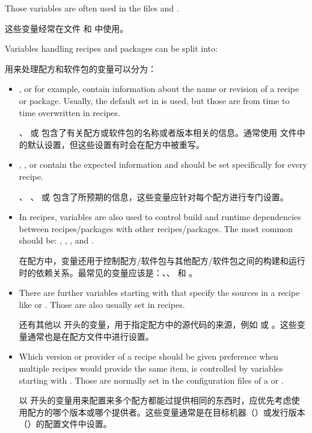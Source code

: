 Those variables are often used in the files  and .

这些变量经常在文件  和  中使用。

Variables handling recipes and packages can be split into:

用来处理配方和软件包的变量可以分为：

\begin{itemize}
\setlength\itemsep{1.0em}
    
\item {},  or  for example, contain information about the name or revision of a recipe or package. Usually, the default set in  is used, but those are from time to time overwritten in recipes.

\medskip
{}、  或  包含了有关配方或软件包的名称或者版本相关的信息。通常使用  文件中的默认设置，但这些设置有时会在配方中被重写。

\item {}, ,  or  contain the expected information and should be set specifically for every recipe.

\medskip
{}、 、  或  包含了所预期的信息，这些变量应针对每个配方进行专门设置。

\item In recipes, variables are also used to control build and runtime dependencies between recipes/packages with other recipes/packages. The most common should be: , , , and .

\medskip
在配方中，变量还用于控制配方/软件包与其他配方/软件包之间的构建和运行时的依赖关系。最常见的变量应该是：、、 和 。

\item There are further variables starting with  that specify the sources in a recipe like  or . Those are also usually set in recipes.

\medskip
还有其他以  开头的变量，用于指定配方中的源代码的来源，例如  或 。这些变量通常也是在配方文件中进行设置。

\item Which version or provider of a recipe should be given preference when multiple recipes would provide the same item, is controlled by variables starting with . Those are normally set in the configuration files of a  or .

\medskip
以  开头的变量用来配置来多个配方都能过提供相同的东西时，应优先考虑使用配方的哪个版本或哪个提供者。这些变量通常是在目标机器（）或发行版本（）的配置文件中设置。
\end{itemize}